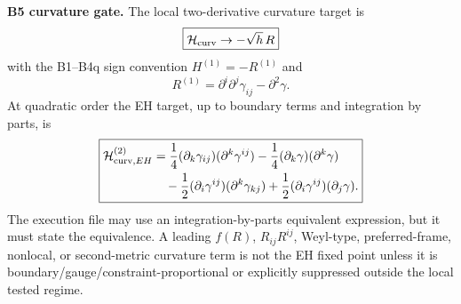 \documentclass[11pt]{article}
\begin{document}
\medskip\noindent\textbf{B5 curvature gate.}
The local two-derivative curvature target is
\[
\boxed{{\cal H}_{\rm curv}\to -\sqrt h\,R}
\]
with the B1--B4q sign convention \(H^{(1)}=-R^{(1)}\) and
\[
\boxed{R^{(1)}=\partial^i\partial^j\gamma_{ij}-\partial^2\gamma.}
\]
At quadratic order the EH target, up to boundary terms and integration by
parts, is
\[
\boxed{
\begin{aligned}
{\cal H}_{{\rm curv},EH}^{(2)}
&=\frac14(\partial_k\gamma_{ij})(\partial^k\gamma^{ij})
-\frac14(\partial_k\gamma)(\partial^k\gamma)\\
&\quad
-\frac12(\partial_i\gamma^{ij})(\partial^k\gamma_{kj})
+\frac12(\partial_i\gamma^{ij})(\partial_j\gamma).
\end{aligned}}
\]
The execution file may use an integration-by-parts equivalent expression, but
it must state the equivalence.  A leading \(f(R)\), \(R_{ij}R^{ij}\),
Weyl-type, preferred-frame, nonlocal, or second-metric curvature term is not
the EH fixed point unless it is boundary/gauge/constraint-proportional or
explicitly suppressed outside the local tested regime.
\end{document}
